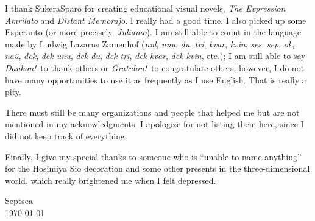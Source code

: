 I thank Sukera\-Sparo for creating educational visual novels,
\textit{The Expression Amrilato}\cite{%
    SukeraSparo:TheExpressionAmrilato}
and \textit{Distant Memora\^jo}\cite{%
    SukeraSparo:DistantMemorajxo}.
I really had a good time.
I also picked up some Esperanto
(or more precisely, \textit{Juliamo}).
I am still able to count in the language
made by Ludwig Lazarus Zamenhof
(\textit{nul}, \textit{unu}, \textit{du}, \textit{tri},
\textit{kvar}, \textit{kvin}, \textit{ses}, \textit{sep},
\textit{ok}, \textit{na\^u}, \textit{dek}, \textit{dek unu},
\textit{dek du}, \textit{dek tri},
\textit{dek kvar}, \textit{dek kvin},
etc.);
I am still able to say \textit{Dankon!}\ to thank others
or \textit{Gratulon!}\ to congratulate others;
however, I do not have many opportunities
to use it as frequently as I use English.
That is really a pity.

There must still be many organizations and people
that helped me but are not mentioned in my acknowledgments.
I apologize for not listing them here,
since I did not keep track of everything.

Finally, I give my special thanks to someone
who is ``unable to name anything''
for the Hosimiya Sio decoration
and some other presents in the three-dimensional world,
which really brightened me when I felt depressed.

\begin{flushright}
    Septsea\\
    \today
\end{flushright}
